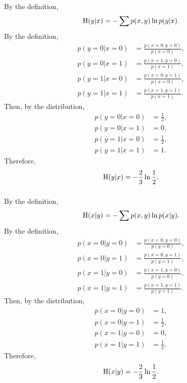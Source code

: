 \subsubsection{}
By the definition,
%
\begin{equation}
{\rm H}(y | x) = - \sum p(x, y) \ln p(y | x).
\end{equation}
%
By the definition,
%
\begin{equation}
\begin{aligned}
p(y = 0 | x = 0) &= \frac{p(x = 0, y = 0)}{p(x = 0)}, \\
p(y = 0 | x = 1) &= \frac{p(x = 1, y = 0)}{p(x = 1)}, \\
p(y = 1 | x = 0) &= \frac{p(x = 0, y = 1)}{p(x = 0)}, \\
p(y = 1 | x = 1) &= \frac{p(x = 1, y = 1)}{p(x = 1)}.
\end{aligned}
\end{equation}
%
Then, by the distribution,
%
\begin{equation}
\begin{aligned}
p(y = 0 | x = 0) &= \frac{1}{2}, \\
p(y = 0 | x = 1) &= 0, \\
p(y = 1 | x = 0) &= \frac{1}{2}, \\
p(y = 1 | x = 1) &= 1.
\end{aligned}
\end{equation}
%
Therefore,
%
\begin{equation}
{\rm H}(y | x) = - \frac{2}{3} \ln \frac{1}{2}.
\end{equation}
%


\subsubsection{}
By the definition,
%
\begin{equation}
{\rm H}(x | y) = - \sum p(x, y) \ln p(x | y).
\end{equation}
%
By the definition,
%
\begin{equation}
\begin{aligned}
p(x = 0 | y = 0) &= \frac{p(x = 0, y = 0)}{p(y = 0)}, \\
p(x = 0 | y = 1) &= \frac{p(x = 0, y = 1)}{p(y = 1)}, \\
p(x = 1 | y = 0) &= \frac{p(x = 1, y = 0)}{p(y = 0)}, \\
p(x = 1 | y = 1) &= \frac{p(x = 1, y = 1)}{p(y = 1)}.
\end{aligned}
\end{equation}
%
Then, by the distribution,
%
\begin{equation}
\begin{aligned}
p(x = 0 | y = 0) &= 1, \\
p(x = 0 | y = 1) &= \frac{1}{2}, \\
p(x = 1 | y = 0) &= 0, \\
p(x = 1 | y = 1) &= \frac{1}{2}.
\end{aligned}
\end{equation}
%
Therefore,
%
\begin{equation}
{\rm H}(x | y) = - \frac{2}{3} \ln \frac{1}{2}.
\end{equation}
%


